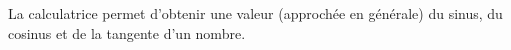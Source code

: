 La calculatrice permet d'obtenir une valeur (approchée en générale) du sinus,
du cosinus et de la tangente d'un nombre.